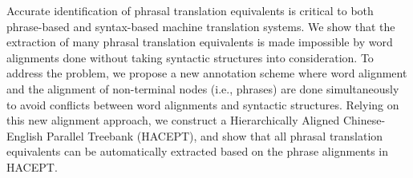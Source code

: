 Accurate identification of phrasal translation equivalents is critical to both phrase-based and syntax-based machine translation systems. We show that the extraction of many phrasal translation equivalents is made impossible by word alignments done without taking syntactic structures into consideration. To address the problem, we propose a new annotation scheme where word alignment and the alignment of non-terminal nodes (i.e., phrases) are done simultaneously to avoid conflicts between word alignments and syntactic structures. Relying on this new alignment approach, we construct a Hierarchically Aligned Chinese-English Parallel Treebank (HACEPT), and show that all phrasal translation equivalents can be automatically extracted based on the phrase alignments in HACEPT.
